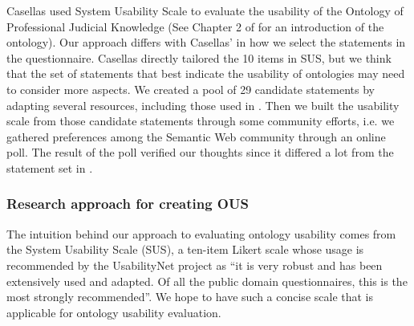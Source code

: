 
Casellas \cite{casellas2009ontology} used System Usability Scale \cite{brooke1996sus} to evaluate the usability of the Ontology of Professional Judicial Knowledge (See Chapter 2 of \cite{casellas2009ontology} for an introduction of the ontology). Our approach differs with Casellas' in how we select the statements in the questionnaire. Casellas directly tailored the 10 items in SUS, but we think that the set of statements that best indicate the usability of ontologies may need to consider more aspects. We created a pool of 29 candidate statements by adapting several resources, including those used in \cite{casellas2009ontology}. Then we built the usability scale from those candidate statements through some community efforts, i.e. we gathered preferences among the Semantic Web community through an online poll. The result of the poll verified our thoughts since it differed a lot from the statement set in \cite{casellas2009ontology}.

\subsubsection{Research approach for creating OUS}
The intuition behind our approach to evaluating ontology usability comes from the System Usability Scale (SUS), a ten-item Likert scale whose usage is recommended by the UsabilityNet project as ``it is very robust and has been extensively used and adapted. Of all the public domain questionnaires, this is the most strongly recommended''. We hope to have such a concise scale that is applicable for ontology usability evaluation.

